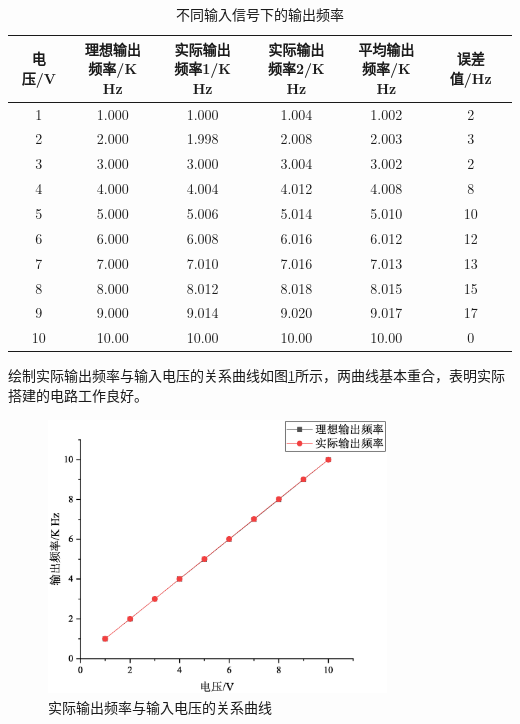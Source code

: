\documentclass[12pt]{article}
\begin{document}
\begin{table}[htbp]
    \centering
    \caption{不同输入信号下的输出频率}
    \label{tab:frequency}
    \begin{tabular}{|c|c|c|c|c|c|}
        \hline
        电压/V & \makecell{理想输出\\频率/K Hz} & \makecell{实际输出\\频率1/K Hz} & \makecell{实际输出\\频率2/K Hz} & \makecell{平均输出\\频率/K Hz} & 误差值/Hz \\
        \hline
        1       & 1.000    & 1.000     & 1.004     & 1.002    & 2      \\
        2       & 2.000    & 1.998     & 2.008     & 2.003    & 3      \\
        3       & 3.000    & 3.000     & 3.004     & 3.002    & 2      \\
        4       & 4.000    & 4.004     & 4.012     & 4.008    & 8      \\
        5       & 5.000    & 5.006     & 5.014     & 5.010    & 10     \\
        6       & 6.000    & 6.008     & 6.016     & 6.012    & 12     \\
        7       & 7.000    & 7.010     & 7.016     & 7.013    & 13     \\
        8       & 8.000    & 8.012     & 8.018     & 8.015    & 15     \\
        9       & 9.000    & 9.014     & 9.020     & 9.017    & 17     \\
        10      & 10.00    & 10.00     & 10.00     & 10.00    & 0      \\
        \hline
    \end{tabular}
\end{table}

绘制实际输出频率与输入电压的关系曲线如图\ref{fig:linear_relationship}所示，两曲线基本重合，表明实际搭建的电路工作良好。

\begin{figure}[htbp]
    \centering
    \includegraphics[width=0.8\textwidth]{fig/linear_relationship.eps}
    \caption{实际输出频率与输入电压的关系曲线}
    \label{fig:linear_relationship}
\end{figure}
\end{document}
